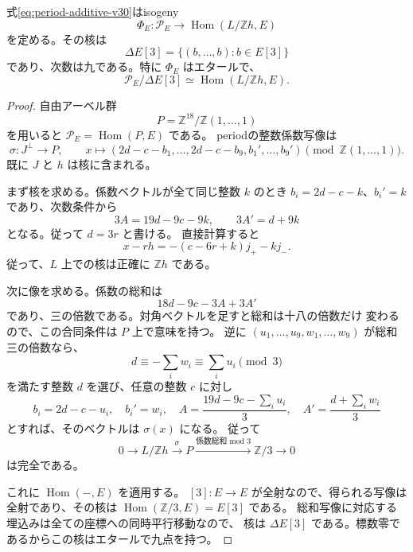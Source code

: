 \begin{theorem}[明示的な偏極periodの被覆]
\label{thm:period-isogeny-v30}
式\eqref{eq:period-additive-v30}はisogeny
\begin{equation}
 \Phi_E:\mathcal P_E\longrightarrow
 \operatorname{Hom}(L/\mathbb Zh,E)
 \label{eq:period-isogeny-v30}
\end{equation}
を定める。その核は
\[
 \Delta E[3]=\{(b,\ldots,b):b\in E[3]\}
\]
であり、次数は九である。特に $\Phi_E$ はエタールで、
\[
 \mathcal P_E/\Delta E[3]\simeq\operatorname{Hom}(L/\mathbb Zh,E).
\]
\end{theorem}

\begin{proof}
自由アーベル群
\[
 P=\mathbb Z^{18}/\mathbb Z(1,\ldots,1)
\]
を用いると $\mathcal P_E=\operatorname{Hom}(P,E)$ である。
periodの整数係数写像は
\begin{equation}
 \sigma:J^\perp\longrightarrow P,\qquad
 x\longmapsto
 (2d-c-b_1,\ldots,2d-c-b_9,b_1',\ldots,b_9')
       \pmod{\mathbb Z(1,\ldots,1)}.
 \label{eq:period-character-v30}
\end{equation}
既に $J$ と $h$ は核に含まれる。

まず核を求める。係数ベクトルが全て同じ整数 $k$ のとき
$b_i=2d-c-k$、$b_i'=k$ であり、次数条件から
\[
 3A=19d-9c-9k,\qquad 3A'=d+9k
\]
となる。従って $d=3r$ と書ける。
直接計算すると
\[
 x-rh=-(c-6r+k)j_+-k j_-.
\]
従って、$L$ 上での核は正確に $\mathbb Zh$ である。

次に像を求める。係数の総和は
\[
 18d-9c-3A+3A'
\]
であり、三の倍数である。対角ベクトルを足すと総和は十八の倍数だけ
変わるので、この合同条件は $P$ 上で意味を持つ。
逆に $(u_1,\ldots,u_9,w_1,\ldots,w_9)$ が総和三の倍数なら、
\[
 d\equiv-\sum_iw_i\equiv\sum_i u_i\pmod3
\]
を満たす整数 $d$ を選び、任意の整数 $c$ に対し
\[
 b_i=2d-c-u_i,\quad b_i'=w_i,\quad
 A=\frac{19d-9c-\sum_i u_i}{3},\quad
 A'=\frac{d+\sum_iw_i}{3}
\]
とすれば、そのベクトルは $\sigma(x)$ になる。
従って
\begin{equation}
 0\longrightarrow L/\mathbb Zh\xrightarrow{\sigma}P
 \xrightarrow{\text{係数総和 mod }3}\mathbb Z/3\longrightarrow0
 \label{eq:period-index-three-v30}
\end{equation}
は完全である。

これに $\operatorname{Hom}(-,E)$ を適用する。
$[3]:E\to E$ が全射なので、得られる写像は全射であり、その核は
$\operatorname{Hom}(\mathbb Z/3,E)=E[3]$ である。
総和写像に対応する埋込みは全ての座標への同時平行移動なので、
核は $\Delta E[3]$ である。標数零であるからこの核はエタールで九点を持つ。
\end{proof}

